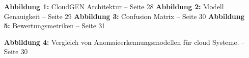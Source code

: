 \documentclass[11pt, a4paper, onecolumn, twoside, titlepage]{scrreprt}
\begin{document}


\blankpage


\renewcommand\thechapter{\Roman{chapter}}

\tableofcontents

\listoffigures
{}
\textbf{Abbildung 1:} CloudGEN Architektur – Seite 28
\nAbsatz
\textbf{Abbildung 2:} Modell Genauigkeit – Seite 29
\nAbsatz
\textbf{Abbildung 3:} Confusion Matrix – Seite 30
\nAbsatz
\textbf{Abbildung 5:} Bewertungsmetriken – Seite 31
\nAbsatz

\ihead[\headmark]{\headmark}

\listoftables
{}
\textbf{Abbildung 4:} Vergleich von Anomaieerkennungsmodellen für cloud Systeme. – Seite 30
\nAbsatz
{}
\ihead[\headmark]{\headmark}



\clearpage
{} 
\renewcommand\thechapter{\arabic{chapter}} 
\setcounter{chapter}{0}

\setcounter{figure}{0}

\setcounter{page}{7}

\ihead[\headmark]{\headmark}














\end{document}
